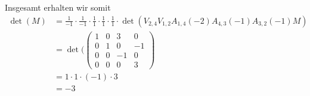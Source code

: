 Insgesamt erhalten wir somit
\begin{align*}
\det(M)&=\frac{1}{-1}\cdot\frac{1}{-1}\cdot\frac{1}{1}\cdot\frac{1}{1}\cdot\frac{1}{1}\cdot\det(V_{2,4}V_{1,2}A_{1,4}(-2)A_{4,3}(-1)A_{3,2}(-1)M)\\
&=\det(\begin{pmatrix}
		1	& 0	&  3	& 0	\\
		0	& 1	&  0	& -1	\\
		0	& 0	&  -1	& 0\\
		0	& 0	&  0& 3
	\end{pmatrix}\\
	&=1\cdot1\cdot(-1)\cdot3\\
	&=-3
\end{align*}
%
%
%
%
%
%

